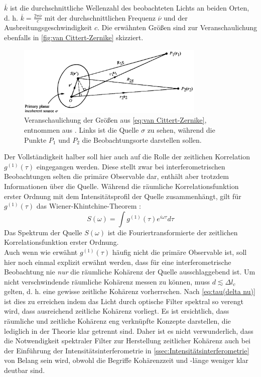 $\overline{k}$ ist die durchschnittliche Wellenzahl des beobachteten Lichts an beiden Orten, d. h. $\overline{k} = \frac{2\pi\overline{\nu}}{c}$ mit der durchschnittlichen Frequenz $\overline{\nu}$ und der Ausbreitungsgeschwindigkeit $c$. 
Die erwähnten Größen sind zur Veranschaulichung ebenfalls in \autoref{fig:van Cittert-Zernike} skizziert. 
\begin{figure}[h]
    \centering
    \includegraphics[width=0.8\textwidth]{images/Theorie/Mandel_4.12.png}
    \caption{Veranschaulichung der Größen aus \autoref{eq:van Cittert-Zernike}, entnommen aus \cite[Abb. 4.12]{mandelOpticalCoherenceQuantum1995}. Links ist die Quelle $\sigma$ zu sehen, während die Punkte $P_1$ und $P_2$ die Beobachtungsorte darstellen sollen. }
    \label{fig:van Cittert-Zernike}
\end{figure}

Der Vollständigkeit halber soll hier auch auf die Rolle der zeitlichen Korrelation $g^{(1)}(\tau)$ eingegangen werden. 
Diese stellt zwar bei interferometrischen Beobachtungen selten die primäre Observable dar, enthält aber trotzdem Informationen über die Quelle. 
Während die räumliche Korrelationsfunktion erster Ordnung mit dem Intensitätsprofil der Quelle zusammenhängt, gilt für $g^{(1)}(\tau)$ das Wiener-Khintchine-Theorem \cite{lasseguesFieldIntensityCorrelations2022}:
\begin{equation}
    S(\omega) =  \int g^{(1)}(\tau) e^{i\omega\tau} d\tau
\end{equation}
Das Spektrum der Quelle $S(\omega)$ ist die Fouriertransformierte der zeitlichen Korrelationsfunktion erster Ordnung. \\
Auch wenn wie erwähnt $g^{(1)}(\tau)$ häufig nicht die primäre Observable ist, soll hier noch einmal explizit erwähnt werden, dass für eine interferometrische Beobachtung nie \emph{nur} die räumliche Kohärenz der Quelle ausschlaggebend ist. 
Um nicht verschwindende räumliche Kohärenz messen zu können, muss $d\lesssim \Delta l_c$ gelten, d. h. eine gewisse zeitliche Kohärenz vorherrschen. 
Nach \autoref{eq:tau(delta nu)} ist dies zu erreichen indem das Licht durch optische Filter spektral so verengt wird, dass ausreichend zeitliche Kohärenz vorliegt. 
Es ist ersichtlich, dass räumliche und zeitliche Kohärenz eng verknüpfte Konzepte darstellen, die lediglich in der Theorie klar getrennt sind. 
Daher ist es nicht verwunderlich, dass die Notwendigkeit spektraler Filter zur Herstellung zeitlicher Kohärenz auch bei der Einführung der Intensitätsinterferometrie in \autoref{ssec:Intensitätsinterferometrie} von Belang sein wird, obwohl die Begriffe Kohärenzzeit und -länge weniger klar deutbar sind. \\

